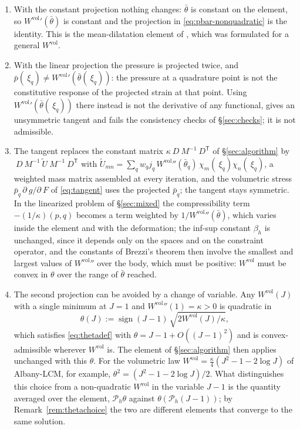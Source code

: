 \documentclass[11pt]{article}
\newcommand{\F}{~F}
\newcommand{\transpose}[1]{#1^{\mathsf{T}}}
\newcommand{\supvol}{^{\mathrm{vol}}}
\theoremstyle{definition}
\theoremstyle{plain}
\begin{document}
\begin{enumerate}
\item With the constant projection nothing changes: $\bar\theta$ is
  constant on the element, so $W\supvol{}'(\bar\theta)$ is constant and the
  projection in \eqref{eq:pbar-nonquadratic} is the identity. This is the
  mean-dilatation element of \citet{SimoTaylorPister:1985}, which was
  formulated for a general $W\supvol$.
\item With the linear projection the pressure is projected twice, and
  $\bar p(~\xi_q) \ne W\supvol{}'(\bar\theta(~\xi_q))$: the pressure at a
  quadrature point is not the constitutive response of the projected
  strain at that point. Using $W\supvol{}'(\bar\theta(~\xi_q))$ there
  instead is not the derivative of any functional, gives an unsymmetric
  tangent and fails the consistency checks of \S\ref{sec:checks}; it is
  not admissible.
\item The tangent replaces the constant matrix $\kappa ~D ~M^{-1}
  \transpose{~D}$ of \S\ref{sec:algorithm} by $~D ~M^{-1} \tilde{~U}
  ~M^{-1} \transpose{~D}$ with $\tilde U_{mn} = \sum_q w_q j_q\,
  W\supvol{}''(\bar\theta_q)\, \chi_m(~\xi_q) \chi_n(~\xi_q)$, a weighted
  mass matrix assembled at every iteration, and the volumetric stress
  $\bar p_q\,\partial ~g/\partial\F$ of \eqref{eq:tangent} uses the
  projected $\bar p_q$; the tangent stays symmetric. In the linearized
  problem of \S\ref{sec:mixed} the compressibility term $-(1/\kappa)(p,q)$
  becomes a term weighted by $1/W\supvol{}''(\bar\theta)$, which varies
  inside the element and with the deformation; the inf-sup constant
  $\beta_h$ is unchanged, since it depends only on the spaces and on the
  constraint operator, and the constants of Brezzi's theorem then involve
  the smallest and largest values of $W\supvol{}''$ over the body, which
  must be positive: $W\supvol$ must be convex in $\theta$ over the range of
  $\bar\theta$ reached.
\item The second projection can be avoided by a change of variable. Any
  $W\supvol(J)$ with a single minimum at $J = 1$ and $W\supvol{}''(1) =
  \kappa > 0$ is quadratic in
  \begin{equation}
    \label{eq:thetafromU}
    \theta(J) := \operatorname{sign}(J - 1)\, \sqrt{2 W\supvol(J)/\kappa} ,
  \end{equation}
  which satisfies \eqref{eq:thetadef} with $\theta = J - 1 + O((J-1)^2)$
  and is convex-admissible wherever $W\supvol$ is. The element of
  \S\ref{sec:algorithm} then applies unchanged with this $\theta$. For the
  volumetric law $W\supvol = \tfrac{\kappa}{4}(J^2 - 1 - 2\log J)$ of
  Albany-LCM, for example, $\theta^2 = (J^2 - 1 - 2\log J)/2$. What
  distinguishes this choice from a non-quadratic $W\supvol$ in the variable
  $J - 1$ is the quantity averaged over the element, $\mathcal{P}_h\theta$
  against $\theta(\mathcal{P}_h(J - 1))$; by Remark~\ref{rem:thetachoice}
  the two are different elements that converge to the same solution.
\end{enumerate}
\end{document}
